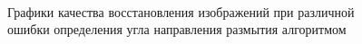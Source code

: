 \begin{figure}[H]
\begin{minipage}[8]{0.46\linewidth}
\\
\end{minipage}

\caption{ Графики качества восстановления изображений при различной ошибки определения угла направления размытия алгоритмом }
\label{ris:plots_a}
\end{figure}

